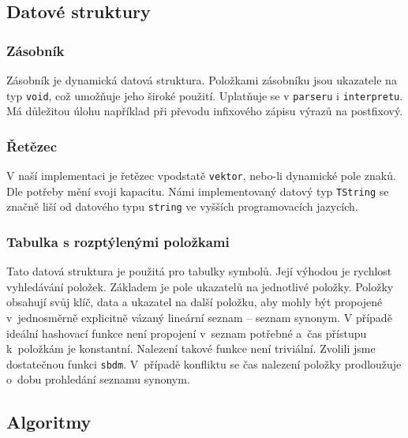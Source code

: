 \documentclass[a4paper, 12pt]{article}
\begin{document}
\newpage

\subsection{Datové struktury}

\subsubsection{Zásobník}
Zásobník je dynamická datová struktura. Položkami zásobníku jsou ukazatele
na typ \texttt{void}, což umožňuje jeho široké použití.
Uplatňuje se v \texttt{parseru} i \texttt{interpretu}. Má důležitou úlohu
například při převodu infixového zápisu výrazů na postfixový.

\subsubsection{Řetězec}
V naší implementaci je řetězec vpodstatě \texttt{vektor}, nebo-li dynamické pole znaků.
Dle potřeby mění svoji kapacitu. Námi implementovaný datový typ \texttt{TString}
se značně liší od datového typu \texttt{string} ve vyšších programovacích
jazycích.

\subsubsection{Tabulka s rozptýlenými položkami}

Tato datová struktura je použitá pro tabulky symbolů. Její výhodou je rychlost
vyhledávání položek. Základem je pole ukazatelů na jednotlivé položky. Položky
obsahují svůj klíč, data a ukazatel na další položku, aby mohly být propojené
v~jednosměrně explicitně vázaný lineární seznam -- seznam synonym. V případě ideální
hashovací funkce není propojení v~seznam potřebné a~čas přístupu k~položkám je
konstantní. Nalezení takové funkce není triviální. Zvolili jsme dostatečnou
funkci \texttt{sbdm}\cite{sbdm}.
V~případě konfliktu se čas nalezení položky prodloužuje o~dobu prohledání
seznamu synonym.

\subsection{Algoritmy}
\end{document}
